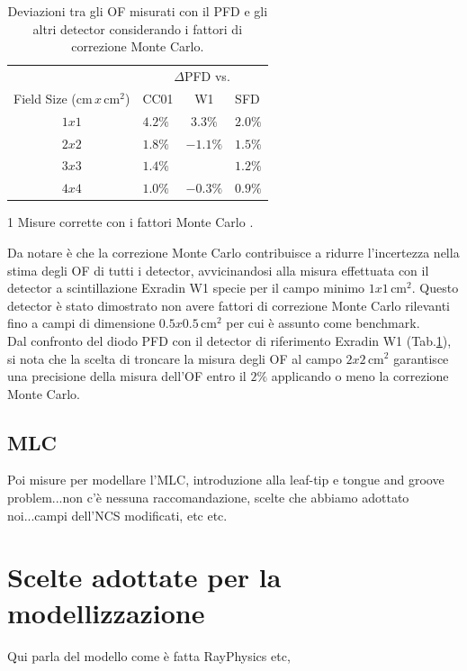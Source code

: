 \begin{table}[!t]
\centering
{}
\begin{threeparttable}
\begin{tabular}{clcl}
\toprule
  & \multicolumn{3}{c}{$\Delta$PFD\tnote{1} vs.}\\
  \cmidrule{2-4}
Field Size (cm$\,x\,$cm$^2$) & CC01\tnote{1} & W1 & SFD\tnote{1} \\
\midrule
$1x1$ &  $4.2\%$ & $3.3\%$  & $2.0\%$ \\
$2x2$ &  $1.8\%$ & $-1.1\%$ & $1.5\%$ \\
$3x3$ &  $1.4\%$ &          & $1.2\%$ \\
$4x4$ &  $1.0\%$ & $-0.3\%$ & $0.9\%$  \\
\bottomrule
\end{tabular}
\begin{tablenotes}
\item[1] Misure corrette con i fattori Monte Carlo \cite{Benmakhlouf2014}.
\end{tablenotes}
\end{threeparttable}
\caption{Deviazioni tra gli OF misurati con il PFD e gli altri detector considerando i fattori di correzione Monte Carlo.}
\label{tab:OFMC}
\end{table}
Da notare è che la correzione Monte Carlo contribuisce a ridurre l'incertezza nella stima degli OF di tutti i detector, avvicinandosi alla misura effettuata con il detector a scintillazione Exradin W1 specie per il campo minimo $1x1\,$cm$^2$. Questo detector è stato dimostrato non avere fattori di correzione Monte Carlo rilevanti fino a campi di dimensione $0.5x0.5\,$cm$^2$ \cite{Francescon2014} per cui è assunto come benchmark.\\
Dal confronto del diodo PFD con il detector di riferimento Exradin W1 (Tab.\ref{tab:OFMC}), si nota che la scelta di troncare la misura degli OF al campo $2x2\,$cm$^2$ garantisce una precisione della misura dell'OF entro il $2\%$ applicando o meno la correzione Monte Carlo.


\subsection{MLC}
Poi misure per modellare l'MLC, introduzione alla leaf-tip e tongue and groove problem...non c'è nessuna raccomandazione, scelte che abbiamo adottato noi...campi dell'NCS modificati, etc etc.



\section{Scelte adottate per la modellizzazione}
Qui parla del modello come è fatta RayPhysics etc,
